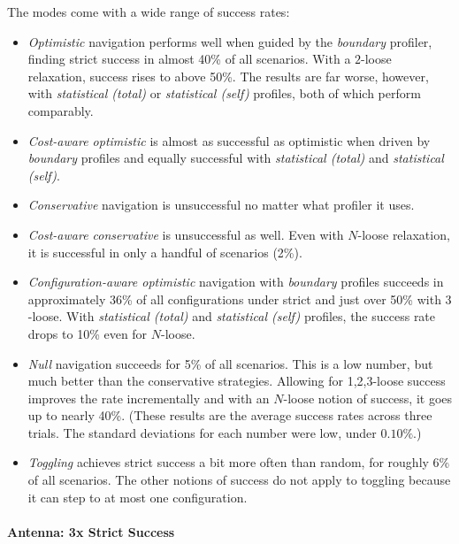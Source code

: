 The modes come with a wide range of success rates: 
\begin{itemize}
  \item
    \emph{Optimistic} navigation performs well when guided by the \emph{boundary} profiler,
    finding strict success in almost 40\% of all scenarios. 
    With a $2$-loose relaxation, success rises to above 50\%.
    The results are far worse, however, with \emph{statistical (total)} or \emph{statistical (self)}
    profiles, both of which perform comparably.

  \item
    \emph{Cost-aware optimistic} is almost as successful as optimistic when driven
    by \emph{boundary} profiles and equally successful with \emph{statistical (total)}
    and \emph{statistical (self)}.

  \item
    \emph{Conservative} navigation is unsuccessful no matter what profiler it uses.

  \item
    \emph{Cost-aware conservative} is unsuccessful as well.
    Even with $N$-loose relaxation, it is successful in only a handful of scenarios (2\%).

  \item
    \emph{Configuration-aware optimistic} navigation with
    \emph{boundary} profiles succeeds in approximately 36\% of all
    configurations under strict and just over 50\% with $3$-loose.
    With \emph{statistical (total)} and \emph{statistical (self)} profiles,
    the success rate drops to 10\% even for $N$-loose.

  \item
    \emph{Null} navigation succeeds for 5\% of all scenarios.
    This is a low number, but much better than the conservative strategies.
    Allowing for 1,2,3-loose success improves the rate incrementally and with an
    $N$-loose notion of success, it goes up to nearly 40\%.
    (These results are the average success rates across three trials. The standard deviations
    for each number were low, under $0.10\%$.)

  \item
    \emph{Toggling} achieves strict success a bit more often than random, for
    roughly 6\% of all scenarios.
    The other notions of success do not apply to toggling because it can step to at most one configuration.
\end{itemize}

\paragraph{Antenna: 3x Strict Success} \label{s:antenna}

